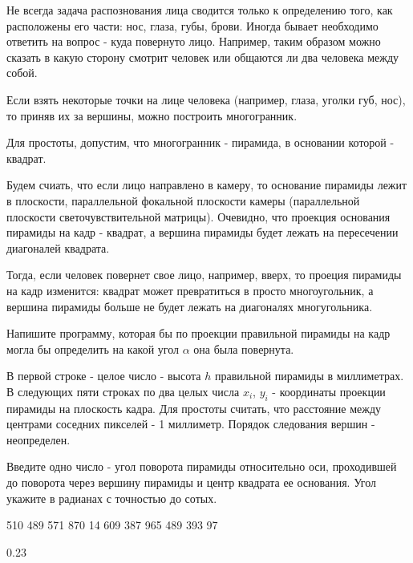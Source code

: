 
Не всегда задача распознования лица сводится только к определению того, как расположены его части: нос, глаза, губы, брови. Иногда бывает необходимо ответить на вопрос - куда повернуто лицо. Например, таким образом можно сказать в какую сторону смотрит человек или общаются ли два человека между собой.

Если взять некоторые точки на лице человека (например, глаза, уголки губ, нос), то приняв их за вершины, можно построить многогранник.


Для простоты, допустим, что многогранник - пирамида, в основании которой - квадрат.


Будем счиать, что если лицо направлено в камеру, то основание пирамиды лежит в плоскости, параллельной фокальной плоскости камеры (параллельной плоскости светочувствительной матрицы). Очевидно, что проекция основания пирамиды на кадр - квадрат, а вершина пирамиды будет лежать на пересечении диагоналей квадрата.

Тогда, если человек повернет свое лицо, например, вверх, то проеция пирамиды на кадр изменится: квадрат может превратиться в просто многоугольник, а вершина пирамиды больше не будет лежать на диагоналях многугольника.


Напишите программу, которая бы по проекции правильной пирамиды на кадр могла бы определить на какой угол $\alpha$ она была повернута.


В первой строке - целое число - высота $h$ правильной пирамиды в миллиметрах. 
В следующих пяти строках по два целых числа $x_i$, $y_i$ - координаты проекции пирамиды на плоскость кадра. Для простоты считать, что расстояние между центрами соседних пикселей - 1 миллиметр. Порядок следования вершин - неопределен.

\outputfmtSection

Введите одно число - угол поворота пирамиды относительно оси, проходившей до поворота через вершину пирамиды и центр квадрата ее основания. Угол укажите в радианах с точностью до сотых.

\exampleSection


\begin{myverbbox}[\small]{\vinput}
510
489 571
870 14
609 387
965 489
393 97
\end{myverbbox}
\begin{myverbbox}[\small]{\voutput}
0.23
\end{myverbbox}


